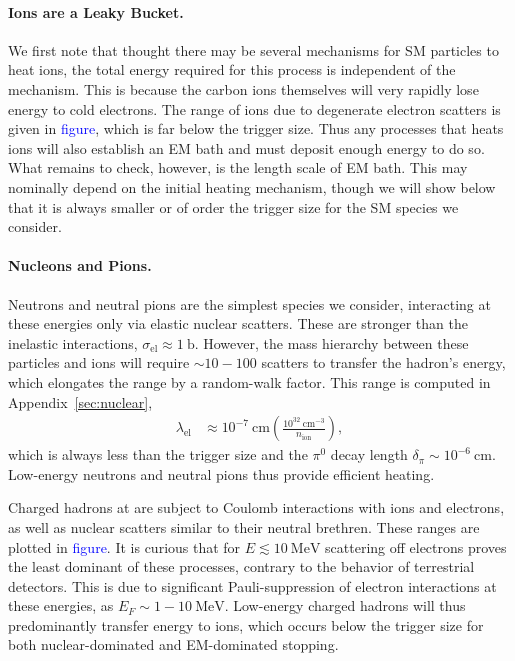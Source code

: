 \documentclass[twocolumn, preprintnumbers,amsmath,amssymb,prd, superscriptaddress]{revtex4}
\newcommand{\MeV}{\text{MeV}}
\def\r{\right)}
\def\l{\left(}
\begin{document}
\paragraph{Ions are a Leaky Bucket.}
We first note that thought there may be several mechanisms for SM particles to heat ions, the total energy required for this process is independent of the mechanism.
This is because the carbon ions themselves will very rapidly lose energy to cold electrons.
The range of ions due to degenerate electron scatters is given in \textcolor{blue}{figure}, which is far below the trigger size.
Thus any processes that heats ions will also establish an EM bath and must deposit enough energy to do so.
What remains to check, however, is the length scale of EM bath. 
This may nominally depend on the initial heating mechanism, though we will show below that it is always smaller or of order the trigger size for the SM species we consider. 

\paragraph{Nucleons and Pions.}
Neutrons and neutral pions are the simplest species we consider, interacting at these energies only via elastic nuclear scatters.
These are stronger than the inelastic interactions, $\sigma_\text{el} \approx 1 ~\text{b}$.
However, the mass hierarchy between these particles and ions will require $\sim 10 - 100$ scatters to transfer the hadron's energy, which elongates the range by a random-walk factor. 
This range is computed in Appendix~\ref{sec:nuclear},
\begin{align}
 \lambda_\text{el} &\approx
 10^{-7} ~\text{cm} \l\frac{10^{32}~\text{cm}^{-3}}{n_\text{ion}}\r,
\end{align}
which is always less than the trigger size and the $\pi^0$ decay length $\delta_\pi \sim 10^{-6} ~\text{cm}$. 
Low-energy neutrons and neutral pions thus provide efficient heating.

Charged hadrons at are subject to Coulomb interactions with ions and electrons, as well as nuclear scatters similar to their neutral brethren. 
These ranges are plotted in \textcolor{blue}{figure}.
It is curious that for $E \lesssim 10~\MeV$ scattering off electrons proves the least dominant of these processes, contrary to the behavior of terrestrial detectors. 
This is due to significant Pauli-suppression of electron interactions at these energies, as $E_F \sim 1-10~\MeV$.
Low-energy charged hadrons will thus predominantly transfer energy to ions, which occurs below the trigger size for both nuclear-dominated and EM-dominated stopping. 
\end{document}
